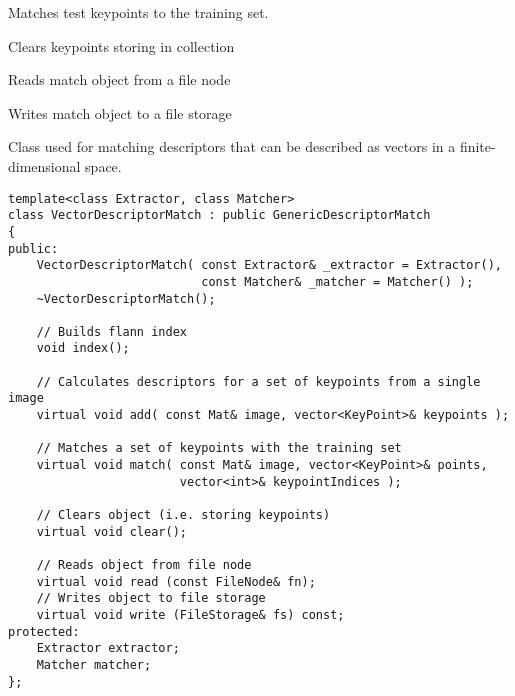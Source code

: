 Matches test keypoints to the training set.


\begin{description}
\end{description}

Clears keypoints storing in collection


Reads match object from a file node
    

Writes match object to a file storage
    

Class used for matching descriptors that can be described as vectors in a finite-dimensional space.

\begin{lstlisting}
template<class Extractor, class Matcher>
class VectorDescriptorMatch : public GenericDescriptorMatch
{
public:
    VectorDescriptorMatch( const Extractor& _extractor = Extractor(),
                           const Matcher& _matcher = Matcher() );
    ~VectorDescriptorMatch();

    // Builds flann index
    void index();

    // Calculates descriptors for a set of keypoints from a single image
    virtual void add( const Mat& image, vector<KeyPoint>& keypoints );

    // Matches a set of keypoints with the training set
    virtual void match( const Mat& image, vector<KeyPoint>& points, 
                        vector<int>& keypointIndices );

    // Clears object (i.e. storing keypoints)
    virtual void clear();

    // Reads object from file node
    virtual void read (const FileNode& fn);
    // Writes object to file storage
    virtual void write (FileStorage& fs) const;
protected:
    Extractor extractor;
    Matcher matcher;
};
\end{lstlisting}

